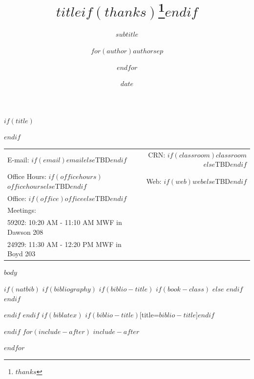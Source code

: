 \documentclass[$if(fontsize)$$fontsize$,$endif$$if(lang)$$babel-lang$,$endif$$if(papersize)$$papersize$,$endif$$for(classoption)$$classoption$$sep$,$endfor$]{article}
\title{$title$$if(thanks)$\thanks{$thanks$}$endif$}
\subtitle{$subtitle$}
\author{$for(author)$$author$$sep$ \and $endfor$}
\date{$date$}
\theoremstyle{warning}
\begin{document}
  

	$if(title)$
	\maketitle
	$endif$
	
	
		\thispagestyle{firststyle}



	\noindent \begin{tabular*}{\textwidth}{ @{\extracolsep{\fill}} lr @{\extracolsep{\fill}}}

  E-mail: $if(email)$\texttt{$email$}$else$TBD$endif$ & 
  CRN: $if(classroom)$$classroom$$else$TBD$endif$\\
  Office Hours: $if(officehours)$$officehours$$else$TBD$endif$  &  
  Web: $if(web)$\href{http://$web$}{\tt $web$}$else$TBD$endif$\\

  Office: $if(office)$$office$$else$TBD$endif$  & \\ 
  \vspace{0.2em}
  Meetings: & \\
  \hspace{1em} 59202: 10:20 AM - 11:10 AM MWF in Dawson 208 & \\
  \hspace{1em} 24929: 11:30 AM - 12:20 PM MWF in Boyd 203 
  &  \\
  \hline
	\end{tabular*}
	

\tableofcontents

\newpage


$body$




$if(natbib)$
$if(bibliography)$
$if(biblio-title)$
$if(book-class)$
\renewcommand\bibname{$biblio-title$}
$else$
\renewcommand\refname{$biblio-title$}
$endif$
$endif$


$endif$
$endif$
$if(biblatex)$
\printbibliography$if(biblio-title)$[title=$biblio-title$]$endif$




$endif$
$for(include-after)$
$include-after$

$endfor$
\end{document}
